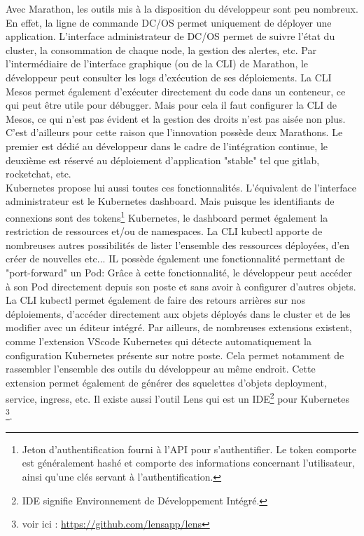 \documentclass[11pt,fleqn]{book} %
\begin{document}
Avec Marathon, les outils mis à la disposition du développeur sont peu nombreux. En effet, la ligne de commande DC/OS permet uniquement de déployer une application. L'interface administrateur de DC/OS permet de suivre l'état du cluster, la consommation de chaque node, la gestion des alertes, etc. Par l'intermédiaire de l'interface graphique (ou de la CLI) de Marathon, le développeur peut consulter les logs d'exécution de ses déploiements. La CLI Mesos permet également d'exécuter directement du code dans un conteneur, ce qui peut être utile pour débugger. Mais pour cela il faut configurer la CLI de Mesos, ce qui n'est pas évident et la gestion des droits n'est pas aisée non plus. C'est d'ailleurs pour cette raison que l'innovation possède deux Marathons. Le premier est dédié au développeur dans le cadre de l'intégration continue, le deuxième est réservé au déploiement d'application "stable" tel que gitlab, rocketchat, etc. \\

Kubernetes propose lui aussi toutes ces fonctionnalités. L'équivalent de l'interface administrateur est le Kubernetes dashboard. Mais puisque les identifiants de connexions sont des tokens\footnote{Jeton d'authentification fourni à l'API pour s'authentifier. Le token comporte est généralement hashé et comporte des informations concernant l'utilisateur, ainsi qu'une clés servant à l'authentification.} Kubernetes, le dashboard permet également la restriction de ressources et/ou de namespaces. La CLI kubectl apporte de nombreuses autres possibilités de lister l'ensemble des ressources déployées, d'en créer de nouvelles etc... IL possède également une fonctionnalité permettant de "port-forward" un Pod: Grâce à cette fonctionnalité, le développeur peut accéder à son Pod directement depuis son poste et sans avoir à configurer d'autres objets. La CLI kubectl permet également de faire des retours arrières sur nos déploiements, d'accéder directement aux objets déployés dans le cluster et de les modifier avec un éditeur intégré. Par ailleurs, de nombreuses extensions existent, comme l'extension VScode Kubernetes qui détecte automatiquement la configuration Kubernetes présente sur notre poste. Cela permet notamment de rassembler l'ensemble des outils du développeur au même endroit. Cette extension permet également de générer des squelettes d'objets deployment, service, ingress, etc. Il existe aussi l'outil Lens qui est un IDE\footnote{IDE signifie Environnement de Développement Intégré.} pour Kubernetes \footnote{voir ici : \url{
https://github.com/lensapp/lens}}.
\end{document}
